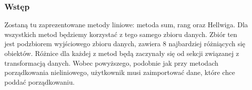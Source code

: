 \documentclass[12pt,a4paper]{report}
\begin{document}
{\subsubsection{Wstęp}\label{wstep}

Zostaną tu zaprezentowane metody liniowe: metoda sum, rang oraz Hellwiga. Dla wszystkich metod będziemy korzystać z tego samego zbioru danych. Zbiór ten jest podzbiorem wyjściowego zbioru danych, zawiera 8 najbardziej różniących się obiektów. Różnice dla każdej z metod będą zaczynały się od sekcji związanej z transformacją danych. 
Wobec powyższego, podobnie jak przy metodach porządkowania nieliniowego, użytkownik musi zaimportować dane, które chce poddać porządkowaniu. 


\begin{Shaded}
\begin{Highlighting}[]
\StringTok{ }\NormalTok{(}\NormalTok{, }
                            \NormalTok{, } \NormalTok{(}\NormalTok{,}\NormalTok{, }
                           \NormalTok{, }\NormalTok{, }\NormalTok{, }\NormalTok{,                                                                              }\NormalTok{,}\NormalTok{, }\NormalTok{, }\NormalTok{, }
                              \NormalTok{, }\NormalTok{, }\NormalTok{,  }\NormalTok{, }
                              \NormalTok{, }\NormalTok{, }\NormalTok{, }\NormalTok{,}\NormalTok{, }
                                  \NormalTok{, }\NormalTok{, }\NormalTok{, }\NormalTok{, }
                                   \NormalTok{, }\NormalTok{, }\NormalTok{,                                                                              }\NormalTok{, }
                                   \NormalTok{, }\NormalTok{, }\NormalTok{))}
\end{Highlighting}
\end{Shaded}

}
\end{document}
